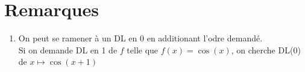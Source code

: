 \documentclass[fleqn]{article}
\theoremstyle{definition} \newtheorem*{defi}{D\'efinition}
\theoremstyle{definition} \newtheorem*{theo}{Th\'eor\`eme}
\theoremstyle{definition} \newtheorem*{prop}{Propri\'et\'e}
\theoremstyle{definition} \newtheorem*{coro}{Corollaire}
\theoremstyle{remark} \newtheorem*{rqs}{Remarques}
\begin{document}
\section{Remarques}
\begin{enumerate}
	\item On peut se ramener \`a un DL en $0$ en additionant l'odre demand\'e. \\
	Si on demande DL en 1 de $f$ telle que $f(x) = \cos(x)$, on cherche DL(0) de $x \mapsto \cos(x+1)$
\end{enumerate}
\end{document}
